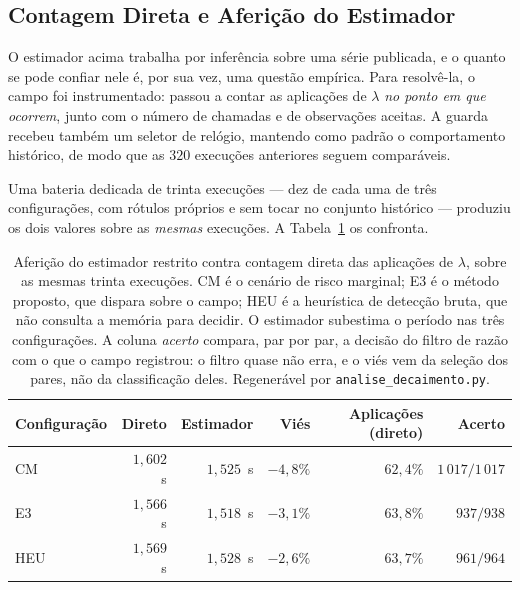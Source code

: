 \subsection{Contagem Direta e Aferição do Estimador}
\label{sec:res-afericao-estimador}

O estimador acima trabalha por inferência sobre uma série publicada, e o quanto se pode
confiar nele é, por sua vez, uma questão empírica. Para resolvê-la, o campo foi
instrumentado: passou a contar as aplicações de $\lambda$ \emph{no ponto em que
ocorrem}, junto com o número de chamadas e de observações aceitas. A guarda recebeu
também um seletor de relógio, mantendo como padrão o comportamento histórico, de modo
que as $320$ execuções anteriores seguem comparáveis.

Uma bateria dedicada de trinta execuções --- dez de cada uma de três configurações, com
rótulos próprios e sem tocar no conjunto histórico --- produziu os dois valores sobre as
\emph{mesmas} execuções. A Tabela~\ref{tab:res-afericao} os confronta.

\begin{table}[htb]
\centering
\caption{Aferição do estimador restrito contra contagem direta das aplicações de
$\lambda$, sobre as mesmas trinta execuções. CM é o cenário de risco marginal; E3 é o
método proposto, que dispara sobre o campo; HEU é a heurística de detecção bruta, que
não consulta a memória para decidir. O estimador subestima o período nas três
configurações. A coluna \emph{acerto} compara, par por par, a decisão do filtro de
razão com o que o campo registrou: o filtro quase não erra, e o viés vem da seleção dos
pares, não da classificação deles. Regenerável por
\texttt{analise\_decaimento.py}.}
\label{tab:res-afericao}
\footnotesize
\begin{tabular}{lrrrrr}
\hline
\textbf{Configuração} & \textbf{Direto} & \textbf{Estimador} & \textbf{Viés} &
\textbf{Aplicações (direto)} & \textbf{Acerto}\\
\hline
CM  & $1{,}602$~s & $1{,}525$~s & $-4{,}8\%$ & $62{,}4\%$ & $1\,017/1\,017$\\
E3  & $1{,}566$~s & $1{,}518$~s & $-3{,}1\%$ & $63{,}8\%$ & $937/938$\\
HEU & $1{,}569$~s & $1{,}528$~s & $-2{,}6\%$ & $63{,}7\%$ & $961/964$\\
\hline
\end{tabular}
\end{table}

